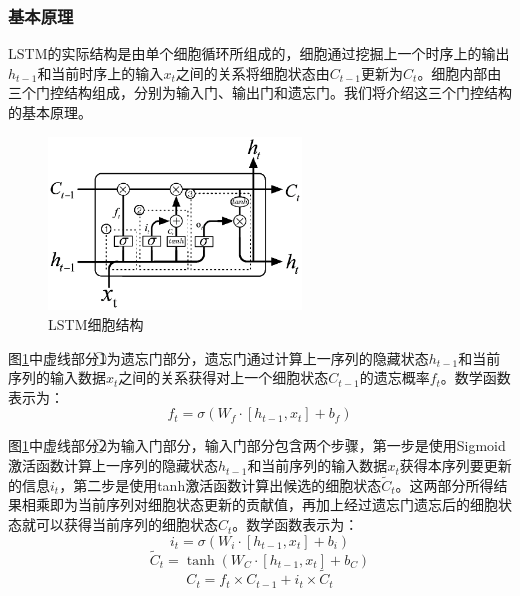 \subsubsection{基本原理}
LSTM的实际结构是由单个细胞循环所组成的，细胞通过挖掘上一个时序上的输出$h_{t-1}$和当前时序上的输入$x_t$之间的关系将细胞状态由$C_{t-1}$更新为$C_{t}$。细胞内部由三个门控结构组成，分别为输入门、输出门和遗忘门。我们将介绍这三个门控结构的基本原理。

\begin{figure}[thb]
\begin{center}
\includegraphics[width=0.6\textwidth]{figures/lstm.eps}
\caption{LSTM细胞结构}\label{fig:lstm}
\end{center}
\end{figure}

图\ref{fig:lstm}中虚线部分\textcircled{1}为遗忘门部分，遗忘门通过计算上一序列的隐藏状态$h_{t-1}$和当前序列的输入数据$x_t$之间的关系获得对上一个细胞状态$C_{t-1}$的遗忘概率$f_{t}$。数学函数表示为：
\begin{equation}
 f_t= \sigma(W_f \cdot [h_{t-1},x_t]+b_f)
\end{equation}

图\ref{fig:lstm}中虚线部分\textcircled{2}为输入门部分，输入门部分包含两个步骤，第一步是使用Sigmoid激活函数计算上一序列的隐藏状态$h_{t-1}$和当前序列的输入数据$x_t$获得本序列要更新的信息$i_t$，第二步是使用tanh激活函数计算出候选的细胞状态$\tilde C_t$。这两部分所得结果相乘即为当前序列对细胞状态更新的贡献值，再加上经过遗忘门遗忘后的细胞状态就可以获得当前序列的细胞状态$C_{t}$。数学函数表示为：
\begin{equation}
 i_t= \sigma(W_i \cdot [h_{t-1},x_t]+b_i)
\end{equation}
\begin{equation}
 \tilde C_t= \tanh(W_C \cdot [h_{t-1},x_t]+b_C)
\end{equation}
\begin{equation}
 C_t= f_t \times C_{t-1} + i_t \times {\tilde C_t}
\end{equation}

